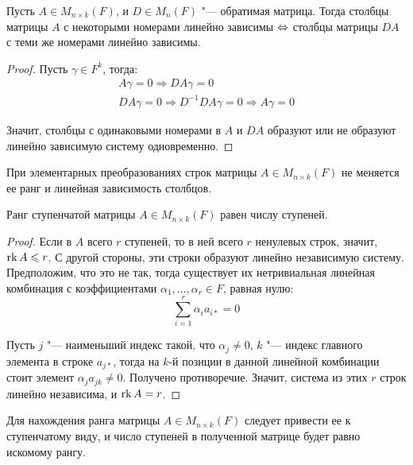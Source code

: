 \begin{proposition}
	Пусть $A \in M_{n \times k}(F)$, и $D \in M_{n}(F)$ "--- обратимая матрица. Тогда столбцы матрицы $A$ с некоторыми номерами линейно зависимы $\Leftrightarrow$ столбцы матрицы $DA$ с теми же номерами линейно зависимы.
\end{proposition}

\begin{proof}
	Пусть $\gamma \in F^k$, тогда:
	\begin{gather*}
		A\gamma = 0 \Rightarrow DA\gamma = 0\\
		DA\gamma = 0 \Rightarrow D^{-1}DA\gamma = 0 \Rightarrow A\gamma = 0
	\end{gather*}
	
	Значит, столбцы с одинаковыми номерами в $A$ и $DA$ образуют или не образуют линейно зависимую систему одновременно.
\end{proof}

\begin{corollary}
	При элементарных преобразованиях строк матрицы $A \in M_{n \times k}(F)$ не меняется ее ранг и линейная зависимость столбцов.
\end{corollary}

\begin{proposition}
	Ранг ступенчатой матрицы $A \in M_{n \times k}(F)$ равен числу ступеней.
\end{proposition}

\begin{proof}
	Если в $A$ всего $r$ ступеней, то в ней всего $r$ ненулевых строк, значит, $\operatorname{rk}{A} \leqslant r$. С другой стороны, эти строки образуют линейно независимую систему. Предположим, что это не так, тогда существует их нетривиальная линейная комбинация с коэффициентами $\alpha_1, \dots, \alpha_r \in F$, равная нулю:
	\[\sum_{i = 1}^{r}\alpha_ia_{i*} = 0\]
	
	Пусть $j$ "--- наименьший индекс такой, что $\alpha_j \ne 0$, $k$ "--- индекс главного элемента в строке $a_{j*}$, тогда на $k$-й позиции в данной линейной комбинации стоит элемент $\alpha_j a_{jk} \ne 0$. Получено противоречие. Значит, система из этих $r$ строк линейно независима, и $\operatorname{rk}{A} = r$.
\end{proof}

\begin{corollary}
	Для нахождения ранга матрицы $A \in M_{n \times k}(F)$ следует привести ее к ступенчатому виду, и число ступеней в полученной матрице будет равно искомому рангу.
\end{corollary}

